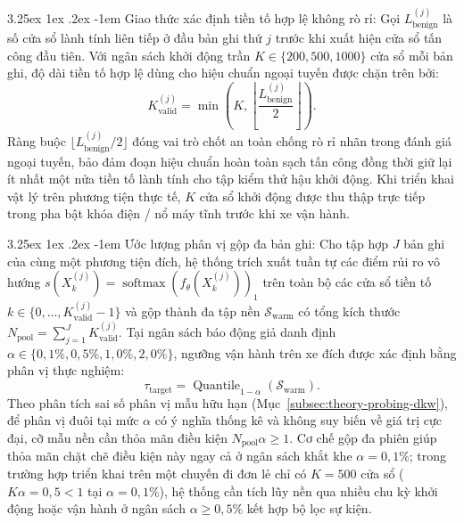 \documentclass[12pt, a4paper, reqno, oneside]{book}
\makeatletter
\renewcommand\paragraph{\@startsection{paragraph}{5}{\z@}%
  {3.25ex \@plus1ex \@minus.2ex}%
  {-1em}%
  {\normalfont\normalsize\bfseries}}
\makeatother
\begin{document}
\paragraph{Giao thức xác định tiền tố hợp lệ không rò rỉ:} Gọi $L_{\text{benign}}^{(j)}$ là số cửa sổ lành tính liên tiếp ở đầu bản ghi thứ $j$ trước khi xuất hiện cửa sổ tấn công đầu tiên. Với ngân sách khởi động trần $K \in \{200, 500, 1000\}$ cửa sổ mỗi bản ghi, độ dài tiền tố hợp lệ dùng cho hiệu chuẩn ngoại tuyến được chặn trên bởi:
\begin{equation}
K_{\text{valid}}^{(j)} = \min\left(K, \left\lfloor \frac{L_{\text{benign}}^{(j)}}{2} \right\rfloor\right).
\end{equation}
Ràng buộc $\lfloor L_{\text{benign}}^{(j)} / 2 \rfloor$ đóng vai trò chốt an toàn chống rò rỉ nhãn trong đánh giá ngoại tuyến, bảo đảm đoạn hiệu chuẩn hoàn toàn sạch tấn công đồng thời giữ lại ít nhất một nửa tiền tố lành tính cho tập kiểm thử hậu khởi động. Khi triển khai vật lý trên phương tiện thực tế, $K$ cửa sổ khởi động được thu thập trực tiếp trong pha bật khóa điện / nổ máy tĩnh trước khi xe vận hành.

\paragraph{Ước lượng phân vị gộp đa bản ghi:} Cho tập hợp $J$ bản ghi của cùng một phương tiện đích, hệ thống trích xuất tuần tự các điểm rủi ro vô hướng $s(X_k^{(j)}) = \operatorname{softmax}(f_\theta(X_k^{(j)}))_1$ trên toàn bộ các cửa sổ tiền tố $k \in \{0, \dots, K_{\text{valid}}^{(j)} - 1\}$ và gộp thành đa tập nền $\mathcal{S}_{\text{warm}}$ có tổng kích thước $N_{\text{pool}} = \sum_{j=1}^{J} K_{\text{valid}}^{(j)}$. Tại ngân sách báo động giả danh định $\alpha \in \{0{,}1\%, 0{,}5\%, 1{,}0\%, 2{,}0\%\}$, ngưỡng vận hành trên xe đích được xác định bằng phân vị thực nghiệm:
\begin{equation}
\tau_{\text{target}} = \operatorname{Quantile}_{1-\alpha}(\mathcal{S}_{\text{warm}}).
\end{equation}
Theo phân tích sai số phân vị mẫu hữu hạn (Mục~\ref{subsec:theory-probing-dkw}), để phân vị đuôi tại mức $\alpha$ có ý nghĩa thống kê và không suy biến về giá trị cực đại, cỡ mẫu nền cần thỏa mãn điều kiện $N_{\text{pool}}\alpha \ge 1$. Cơ chế gộp đa phiên giúp thỏa mãn chặt chẽ điều kiện này ngay cả ở ngân sách khắt khe $\alpha = 0{,}1\%$; trong trường hợp triển khai trên một chuyến đi đơn lẻ chỉ có $K = 500$ cửa sổ ($K\alpha = 0{,}5 < 1$ tại $\alpha = 0{,}1\%$), hệ thống cần tích lũy nền qua nhiều chu kỳ khởi động hoặc vận hành ở ngân sách $\alpha \ge 0{,}5\%$ kết hợp bộ lọc sự kiện.
\end{document}
